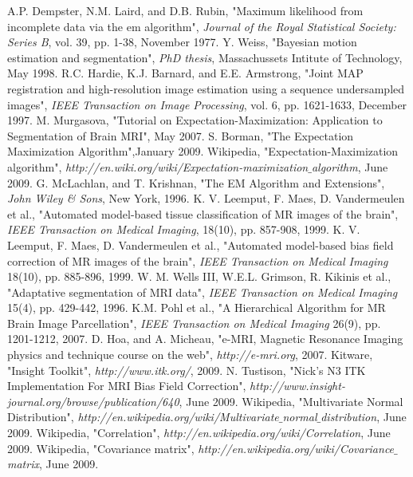\begin{thebibliography}{9999}%
%
A.P. Dempster, N.M. Laird, and D.B. Rubin, "Maximum likelihood from incomplete data via the em algorithm", \textsl{Journal of the Royal Statistical Society: Series B}, vol. 39, pp. 1-38, November 1977.
%
Y. Weiss, "Bayesian motion estimation and segmentation", \textsl{PhD thesis}, Massachussets Intitute of Technology, May 1998.
%
R.C. Hardie, K.J. Barnard, and E.E. Armstrong, "Joint MAP registration and high-resolution image estimation using a sequence undersampled images", \textsl{IEEE Transaction on Image Processing}, vol. 6, pp. 1621-1633, December 1997.
%
M. Murgasova, "Tutorial on Expectation-Maximization: Application to Segmentation of Brain MRI", May 2007.
%
S. Borman, "The Expectation Maximization Algorithm",January 2009.
%
Wikipedia, "Expectation-Maximization algorithm", \textsl{http://en.wiki.org/wiki/Expectation-maximization$\_$algorithm}, June 2009.
%
G. McLachlan, and T. Krishnan, "The EM Algorithm and Extensions", \textsl{John Wiley \& Sons}, New York, 1996.
%
K. V. Leemput, F. Maes, D. Vandermeulen et al., "Automated model-based tissue classification of MR images of the brain", \textsl{IEEE Transaction on Medical Imaging}, 18(10), pp. 857-908, 1999.
%
K. V. Leemput, F. Maes, D. Vandermeulen et al., "Automated model-based bias field correction of MR images of the brain", \textsl{IEEE Transaction on Medical Imaging} 18(10), pp. 885-896, 1999.
%
W. M. Wells III, W.E.L. Grimson, R. Kikinis et al., "Adaptative segmentation of MRI data", \textsl{IEEE Transaction on Medical Imaging} 15(4), pp. 429-442, 1996.
%
K.M. Pohl et al., "A Hierarchical Algorithm for MR Brain Image Parcellation", \textsl{IEEE Transaction on Medical Imaging} 26(9), pp. 1201-1212, 2007.
%
D. Hoa, and A. Micheau, "e-MRI, Magnetic Resonance Imaging physics and technique course on the web", \textsl{http://e-mri.org}, 2007.
%
Kitware, "Insight Toolkit", \textsl{http://www.itk.org/}, 2009.
%
N. Tustison, "Nick's N3 ITK Implementation For MRI Bias Field Correction", \textsl{http://www.insight-journal.org/browse/publication/640}, June 2009.
%
Wikipedia, "Multivariate Normal Distribution", \textsl{http://en.wikipedia.org/wiki/Multivariate$\_$normal$\_$distribution}, June 2009.
%
Wikipedia, "Correlation", \textsl{http://en.wikipedia.org/wiki/Correlation}, June 2009.
%
Wikipedia, "Covariance matrix", \textsl{http://en.wikipedia.org/wiki/Covariance$\_$matrix}, June 2009.
%
%
%
\end{thebibliography}
